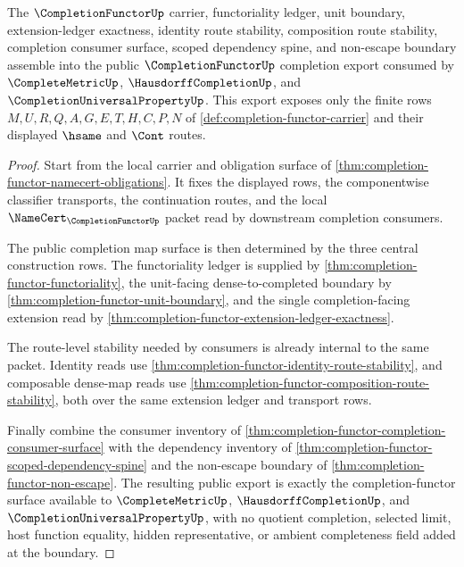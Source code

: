 \begin{theorem}
\label{thm:completion-functor-public-completion-export}
The $\CompletionFunctorUp$ carrier, functoriality ledger, unit boundary, extension-ledger exactness, identity route stability, composition route stability, completion consumer surface, scoped dependency spine, and non-escape boundary assemble into the public $\CompletionFunctorUp$ completion export consumed by $\CompleteMetricUp$, $\HausdorffCompletionUp$, and $\CompletionUniversalPropertyUp$. This export exposes only the finite rows $M,U,R,Q,A,G,E,T,H,C,P,N$ of \autoref{def:completion-functor-carrier} and their displayed $\hsame$ and $\Cont$ routes.
\end{theorem}
\begin{proof}
Start from the local carrier and obligation surface of \autoref{thm:completion-functor-namecert-obligations}. It fixes the displayed rows, the componentwise classifier transports, the continuation routes, and the local $\NameCert_{\CompletionFunctorUp}$ packet read by downstream completion consumers.

The public completion map surface is then determined by the three central construction rows. The functoriality ledger is supplied by \autoref{thm:completion-functor-functoriality}, the unit-facing dense-to-completed boundary by \autoref{thm:completion-functor-unit-boundary}, and the single completion-facing extension read by \autoref{thm:completion-functor-extension-ledger-exactness}.

The route-level stability needed by consumers is already internal to the same packet. Identity reads use \autoref{thm:completion-functor-identity-route-stability}, and composable dense-map reads use \autoref{thm:completion-functor-composition-route-stability}, both over the same extension ledger and transport rows.

Finally combine the consumer inventory of \autoref{thm:completion-functor-completion-consumer-surface} with the dependency inventory of \autoref{thm:completion-functor-scoped-dependency-spine} and the non-escape boundary of \autoref{thm:completion-functor-non-escape}. The resulting public export is exactly the completion-functor surface available to $\CompleteMetricUp$, $\HausdorffCompletionUp$, and $\CompletionUniversalPropertyUp$, with no quotient completion, selected limit, host function equality, hidden representative, or ambient completeness field added at the boundary.
\end{proof}

